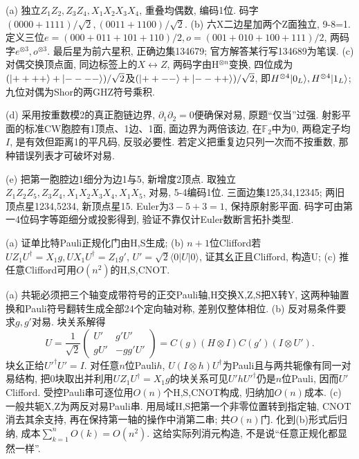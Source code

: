 \begin{solution}(a) 独立$Z_1Z_2,Z_3Z_4,X_1X_2X_3X_4$, 重叠均偶数, 编码1位. 码字$(0000+1111)/\sqrt2,(0011+1100)/\sqrt2$. (b) 六X二边星加两个Z面独立, 9-8=1. 定义三位$e=(000+011+101+110)/2,o=(001+010+100+111)/2$, 两码字$e^{\otimes3},o^{\otimes3}$. 最后星为前六星积, 正确边集134679; 官方解答某行写134689为笔误. (c) 对偶交换顶点面, 同边标签上的$X\leftrightarrow Z$, 两码字由H$^{\otimes n}$变换, 四位成为$(\lvert ++++\rangle+\lvert ----\rangle)/\sqrt2$及$(\lvert ++--\rangle+\lvert --++\rangle)/\sqrt2$, 即$H^{\otimes4}\lvert 0_L\rangle,H^{\otimes4}\lvert 1_L\rangle$; 九位对偶为Shor的两GHZ符号乘积.

(d) 采用按重数模2的真正胞链边界, $\partial_1\partial_2=0$便确保对易, 原题“仅当”过强. 射影平面的标准CW胞腔有1顶点、1边、1面, 面边界为两倍该边, 在$\mathbb F_2$中为0, 两稳定子均$I$, 是有效但距离1的平凡码, 反驳必要性. 若定义把重复边只列一次而不按重数, 那种错误列表才可破坏对易.

(e) 把第一胞腔边1细分为边1与5, 新增度2顶点. 取独立$Z_1Z_2Z_5,Z_3Z_4,X_1X_2X_3X_4,X_1X_5$, 对易, 5-4编码1位. 三面边集125,34,12345; 两旧顶点星1234,5234, 新顶点星15. Euler为$3-5+3=1$, 保持原射影平面. 码字可由第一4位码字等距细分或投影得到, 验证不靠仅计Euler数断言拓扑类型.
\end{solution}
\begin{exercise}(a) 证单比特Pauli正规化门由H,S生成; (b) $n+1$位Clifford若$UZ_1U^\dagger=X_1g,UX_1U^\dagger=Z_1g'$, $U'=\sqrt2\langle0|U|0\rangle$, 证其幺正且Clifford, 构造U; (c) 推任意Clifford可用$O(n^2)$的H,S,CNOT.\end{exercise}
\begin{solution}(a) 共轭必须把三个轴变成带符号的正交Pauli轴,H交换X,Z,S把X转Y, 这两种轴置换和Pauli符号翻转生成全部24个定向轴对称, 差别仅整体相位. (b) 反对易条件要求$g,g'$对易. 块关系解得
\[U=\frac1{\sqrt2}\begin{pmatrix}U'&g'U'\\gU'&-gg'U'\end{pmatrix}=C(g)(H\otimes I)C(g')(I\otimes U').\]
块幺正给$U'^\dagger U'=I$. 对任意$n$位Pauli$h$, $U(I\otimes h)U^\dagger$为Pauli且与两共轭像有同一对易结构, 把0块取出并利用$UZ_1U^\dagger=X_1g$的块关系可见$U'hU'^\dagger$仍是$n$位Pauli, 因而$U'$Clifford. 受控Pauli串可逐位用$O(n)$个H,S,CNOT构成, 归纳加$O(n)$成本. (c) 一般共轭X,Z为两反对易Pauli串. 用局域H,S把第一个非零位置转到指定轴, CNOT消去其余支持, 再在保持第一轴的操作中消第二串; 共$O(n)$门. 化到(b)形式后归纳, 成本$\sum_{k=1}^nO(k)=O(n^2)$. 这给实际列消元构造, 不是说“任意正规化都显然一样”.
\end{solution}
